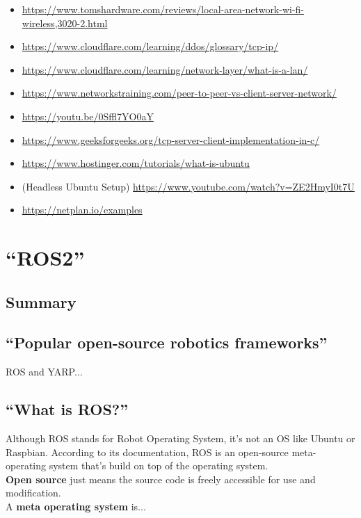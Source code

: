 \documentclass[a4paper, 10pt]{article}
\begin{document}
\begin{itemize}
        \item \url{https://www.tomshardware.com/reviews/local-area-network-wi-fi-wireless,3020-2.html}
        \item \url{https://www.cloudflare.com/learning/ddos/glossary/tcp-ip/}
        \item \url{https://www.cloudflare.com/learning/network-layer/what-is-a-lan/}
        \item \url{https://www.networkstraining.com/peer-to-peer-vs-client-server-network/}
        \item \url{https://youtu.be/0Sffl7YO0aY}
        \item \url{https://www.geeksforgeeks.org/tcp-server-client-implementation-in-c/}
        \item \url{https://www.hostinger.com/tutorials/what-is-ubuntu}
        \item (Headless Ubuntu Setup) \url{https://www.youtube.com/watch?v=ZE2HmyI0t7U}
        \item \url{https://netplan.io/examples}
        \end{itemize}



 \pagebreak

\section{``ROS2''}
\subsection*{Summary}
	\subsection{``Popular open-source robotics frameworks''}
	ROS and YARP...

        \subsection{``What is ROS?''}
        Although ROS stands for Robot Operating System, it’s not an OS  like Ubuntu or Raspbian. According to its documentation, ROS is an open-source meta-operating system that’s build on top of the operating system.\\
        \textbf{Open source} just means the source code is freely accessible for use and modification.\\
        A \textbf{meta operating system} is... \\
        
\end{document}
